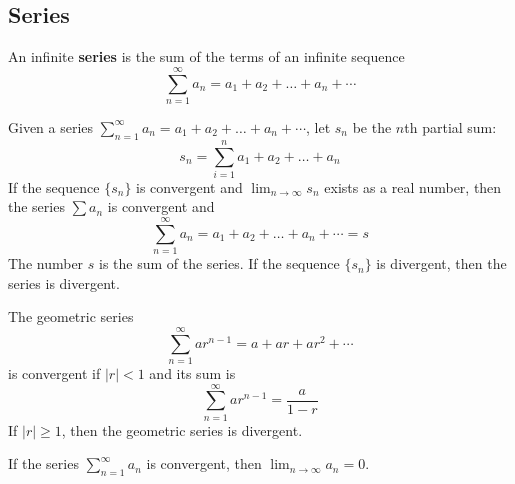 \subsection{Series}
An infinite \textbf{series} is the sum of the terms of an infinite sequence
\[\sum_{n=1}^{\infty}a_n=a_1+a_2+\dots+a_n+\cdots\]
\begin{definition}
    Given a series \(\sum_{n=1}^{\infty}a_n=a_1+a_2+\dots+a_n+\cdots\), let
    \(s_n\) be the \(n\)th partial sum:
    \[s_n=\sum_{i=1}^n a_1+a_2+\dots+a_n\]
    If the sequence \(\{s_n\}\) is convergent and \(\lim_{n\to\infty}s_n\)
    exists as a real number, then the series \(\sum a_n\) is convergent and
    \[\sum_{n=1}^{\infty}a_n=a_1+a_2+\dots+a_n+\cdots=s\]
    The number \(s\) is the sum of the series.
    If the sequence \(\{s_n\}\) is divergent, then the series is divergent.
\end{definition}
The geometric series
\[\sum_{n=1}^\infty ar^{n-1}=a+ar+ar^2+\cdots\] is convergent if \(|r|<1\) and
its sum is
\[\sum_{n=1}^\infty ar^{n-1}=\frac{a}{1-r}\]
If \(|r|\geq 1\), then the geometric series is divergent.
\begin{theorem}
    If the series \(\sum_{n=1}^{\infty}a_n\) is convergent, then
    \(\lim_{n\to\infty}a_n=0\).
\end{theorem}
